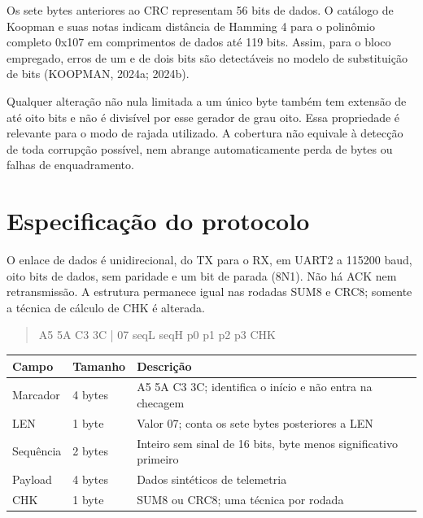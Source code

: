 \documentclass[12pt,a4paper]{article}
\begin{document}
Os sete bytes anteriores ao CRC representam 56 bits de dados. O catálogo de Koopman e suas notas indicam distância de Hamming 4 para o polinômio completo 0x107 em comprimentos de dados até 119 bits. Assim, para o bloco empregado, erros de um e de dois bits são detectáveis no modelo de substituição de bits (KOOPMAN, 2024a; 2024b).

Qualquer alteração não nula limitada a um único byte também tem extensão de até oito bits e não é divisível por esse gerador de grau oito. Essa propriedade é relevante para o modo de rajada utilizado. A cobertura não equivale à detecção de toda corrupção possível, nem abrange automaticamente perda de bytes ou falhas de enquadramento.

\FloatBarrier
\section{Especificação do protocolo}
O enlace de dados é unidirecional, do TX para o RX, em UART2 a 115200 baud, oito bits de dados, sem paridade e um bit de parada (8N1). Não há ACK nem retransmissão. A estrutura permanece igual nas rodadas SUM8 e CRC8; somente a técnica de cálculo de CHK é alterada.

\begin{quote}\small\ttfamily\raggedright A5 5A C3 3C | 07 seqL seqH p0 p1 p2 p3 CHK\end{quote}

\par\smallskip\noindent\begin{minipage}{\textwidth}\centering\small
{}
\begin{tabularx}{\textwidth}{@{}l l Y@{}}\toprule
\textbf{Campo} & \textbf{Tamanho} & \textbf{Descrição}\\\midrule
Marcador & 4 bytes & A5 5A C3 3C; identifica o início e não entra na checagem\\
LEN & 1 byte & Valor 07; conta os sete bytes posteriores a LEN\\
Sequência & 2 bytes & Inteiro sem sinal de 16 bits, byte menos significativo primeiro\\
Payload & 4 bytes & Dados sintéticos de telemetria\\
CHK & 1 byte & SUM8 ou CRC8; uma técnica por rodada\\
\bottomrule\end{tabularx}
\par{}\end{minipage}\par\smallskip
\end{document}
